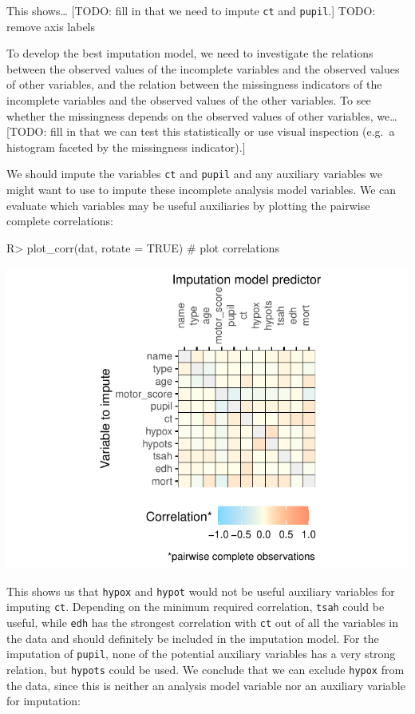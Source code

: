 \documentclass[
]{jss}
\begin{document}
This shows\ldots{} {[}TODO: fill in that we need to impute \texttt{ct}
and \texttt{pupil}.{]} TODO: remove axis labels

To develop the best imputation model, we need to investigate the
relations between the observed values of the incomplete variables and
the observed values of other variables, and the relation between the
missingness indicators of the incomplete variables and the observed
values of the other variables. To see whether the missingness depends on
the observed values of other variables, we\ldots{} {[}TODO: fill in that
we can test this statistically or use visual inspection (e.g.~a
histogram faceted by the missingness indicator).{]}

We should impute the variables \texttt{ct} and \texttt{pupil} and any
auxiliary variables we might want to use to impute these incomplete
analysis model variables. We can evaluate which variables may be useful
auxiliaries by plotting the pairwise complete correlations:

\begin{CodeChunk}
\begin{CodeInput}
R> plot_corr(dat, rotate = TRUE) # plot correlations 
\end{CodeInput}


\begin{center}\includegraphics{Imputation_of_Incomplete_Multilevel_Data_files/figure-latex/impact_corr-1} \end{center}

\end{CodeChunk}

This shows us that \texttt{hypox} and \texttt{hypot} would not be useful
auxiliary variables for imputing \texttt{ct}. Depending on the minimum
required correlation, \texttt{tsah} could be useful, while \texttt{edh}
has the strongest correlation with \texttt{ct} out of all the variables
in the data and should definitely be included in the imputation model.
For the imputation of \texttt{pupil}, none of the potential auxiliary
variables has a very strong relation, but \texttt{hypots} could be used.
We conclude that we can exclude \texttt{hypox} from the data, since this
is neither an analysis model variable nor an auxiliary variable for
imputation:
\end{document}
